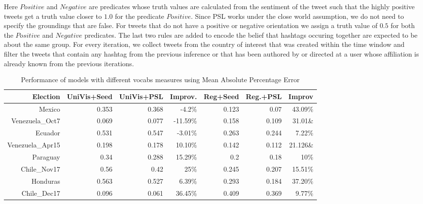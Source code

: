 Here $Positive$ and $Negative$ are predicates whose truth values are calculated from the sentiment of the tweet such that the highly positive tweets get a truth value closer to $1.0$ for the predicate $Positive$. 
Since PSL works under the close world assumption, we do not need to specify the groundings that are false.
For tweets that do not have a positive or negative orientation we assign a truth value of $0.5$ for both the $Positive$ and $Negative$ predicates.
The last two rules are added to encode the belief that hashtags occuring together are expected to be about the same group.
For every iteration, we collect tweets from the country of interest that was created within the time window and filter the tweets that contain any hashtag from the previous inference  or that has been authored by or directed at a user whose affiliation is already known from the previous iterations.
\begin{table*}[Ht]
	\centering
	\begin{tabular}{| r || r | r | r | r | r | r |}
 	\hline
 	Election & UniVis+Seed & UniVis+PSL & Improv. & Reg+Seed & Reg.+PSL & Improv\\
 	\hline
	Mexico & 0.353 & 0.368 & -4.2\% & 0.123 & 0.07 & 43.09\% \\ 	
 	Venezuela\_Oct7 & 0.069	& 0.077 & -11.59\% & 0.158 & 0.109 & 31.01\&\\
	Ecuador & 0.531 & 0.547 & -3.01\% & 0.263 & 0.244 & 7.22\% \\
	Venezuela\_Apr15 & 0.198 & 0.178 & 10.10\% & 0.142 & 0.112 & 21.126\&\\
	Paraguay & 0.34 & 0.288 & 15.29\% & 0.2 & 0.18 & 10\% \\
	Chile\_Nov17 & 0.56 & 0.42 & 25\% & 0.245 & 0.207 & 15.51\% \\
	Honduras & 0.563 & 0.527 & 6.39\% & 0.293 & 0.184 & 37.20\% \\
	Chile\_Dec17 & 0.096 & 0.061 & 36.45\% & 0.409 & 0.369 & 9.77\% \\
 	\hline
	\end{tabular}
	\vspace{-0.5em}
	\caption{Performance of models with different vocabs measures using Mean Absolute Percentage Error}
	\label{table:improvement}
	\vspace{-0.5em}
\end{table*}	
